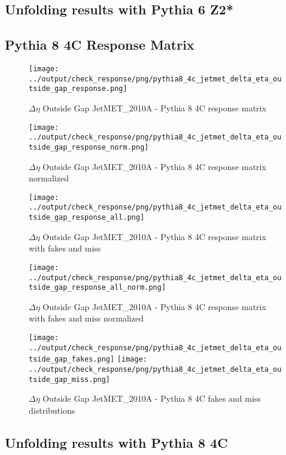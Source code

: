 \documentclass[11pt]{book}
\begin{document}
\clearpage
\subsection{Unfolding results with Pythia 6 Z2*}


\clearpage
\subsection{Pythia 8 4C Response Matrix}


\begin{figure}[ht]
\centering
\texttt{[image: ../output/check\_response/png/pythia8\_4c\_jetmet\_delta\_eta\_outside\_gap\_response.png]}
\caption{$\Delta\eta$ Outside Gap JetMET\_2010A - Pythia 8 4C response matrix}
\label{p8_jetmet_delta_eta_outside_gap_response}
\end{figure}

\begin{figure}[ht]
\centering
\texttt{[image: ../output/check\_response/png/pythia8\_4c\_jetmet\_delta\_eta\_outside\_gap\_response\_norm.png]}
\caption{$\Delta\eta$ Outside Gap JetMET\_2010A - Pythia 8 4C response matrix normalized}
\label{p8_jetmet_delta_eta_outside_gap_response_norm}
\end{figure}

\begin{figure}[ht]
\centering
\texttt{[image: ../output/check\_response/png/pythia8\_4c\_jetmet\_delta\_eta\_outside\_gap\_response\_all.png]}
\caption{$\Delta\eta$ Outside Gap JetMET\_2010A - Pythia 8 4C response matrix with fakes and miss}
\label{p8_jetmet_delta_eta_outside_gap_response_all}
\end{figure}

\begin{figure}[ht]
\centering
\texttt{[image: ../output/check\_response/png/pythia8\_4c\_jetmet\_delta\_eta\_outside\_gap\_response\_all\_norm.png]}
\caption{$\Delta\eta$ Outside Gap JetMET\_2010A - Pythia 8 4C response matrix with fakes and miss normalized}
\label{p8_jetmet_delta_eta_outside_gap_response_all_norm}
\end{figure}

\begin{figure}[ht]
\centering
\texttt{[image: ../output/check\_response/png/pythia8\_4c\_jetmet\_delta\_eta\_outside\_gap\_fakes.png]}
\texttt{[image: ../output/check\_response/png/pythia8\_4c\_jetmet\_delta\_eta\_outside\_gap\_miss.png]}
\caption{$\Delta\eta$ Outside Gap JetMET\_2010A - Pythia 8 4C fakes and miss distributions}
\label{p8_jetmet_delta_eta_outside_gap_fakesmiss}
\end{figure}


\clearpage
\subsection{Unfolding results with Pythia 8 4C}

\listoffigures

 
\end{document}
